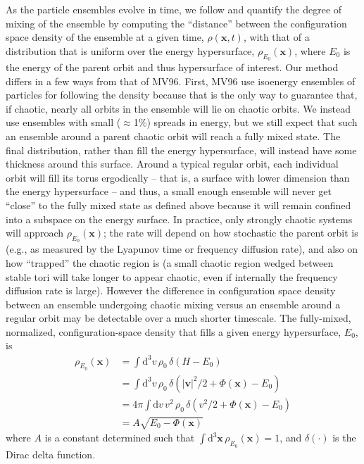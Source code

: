\documentclass[letterpaper,12pt,preprint]{aastex}
\newcommand{\dd}{\mathrm{d}}
\newcommand{\bs}[1]{\boldsymbol{#1}}
\begin{document}
As the particle ensembles evolve in time, we follow \citet[][hereafter MV96]{merritt96} and quantify the degree of mixing of the ensemble by computing the ``distance'' between the configuration space density of the ensemble at a given time, $\rho(\bs{x},t)$, with that of a distribution that is uniform over the energy hypersurface, $\rho_{E_0}(\bs{x})$, where $E_0$ is the energy of the parent orbit and thus hypersurface of interest. Our method differs in a few ways from that of MV96. First, MV96 use isoenergy ensembles of particles for following the density because that is the only way to guarantee that, if chaotic, nearly all orbits in the ensemble will lie on chaotic orbits. We instead use ensembles with small ($\approx$1\%) spreads in energy, but we still expect that such an ensemble around a parent chaotic orbit will reach a fully mixed state. The final distribution, rather than fill the energy hypersurface, will instead have some thickness around this surface. Around a typical regular orbit, each individual orbit will fill its torus ergodically -- that is, a surface with lower dimension than the energy hypersurface -- and thus, a small enough ensemble will never get ``close'' to the fully mixed state as defined above because it will remain confined into a subspace on the energy surface. In practice, only strongly chaotic systems will approach $\rho_{E_0}(\bs{x})$; the rate will depend on how stochastic the parent orbit is (e.g., as measured by the Lyapunov time or frequency diffusion rate), and also on how ``trapped'' the chaotic region is (a small chaotic region wedged between stable tori will take longer to appear chaotic, even if internally the frequency diffusion rate is large). However the difference in configuration space density between an ensemble undergoing chaotic mixing versus an ensemble around a regular orbit may be detectable over a much shorter timescale. The fully-mixed, normalized, configuration-space density that fills a given energy hypersurface, $E_0$, is 
\begin{align}
	\rho_{E_0}(\bs{x}) &= \int \dd^3v \, \rho_0 \, \delta(H - E_0)\\
	&= \int \dd^3v \, \rho_0 \, \delta\left(|\bs{v}|^2/2 + \Phi(\bs{x}) - E_0\right)\\
	&= 4\pi \int \dd v \, v^2 \, \rho_0 \, \delta\left(v^2/2 + \Phi(\bs{x}) - E_0\right)\\
	&= A \sqrt{E_0 - \Phi(\bs{x})}
\end{align}
where $A$ is a constant determined such that $\int \dd^3\bs{x} \, \rho_{E_0}(\bs{x}) = 1$, and $\delta(\cdot)$ is the Dirac delta function. 
\end{document}
